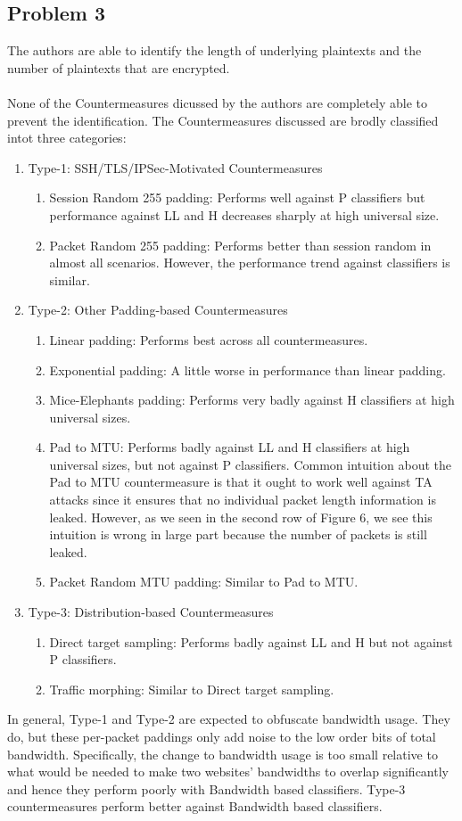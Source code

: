 \documentclass[10pt]{article}
\begin{document}
\begin{itemize}
\section{Problem 3}
The authors are able to identify the length of underlying plaintexts and the number of plaintexts that are encrypted.\\\\
None of the Countermeasures dicussed by the authors are completely able to prevent the identification. The Countermeasures discussed are brodly classified intot three categories:
\begin{enumerate}
\item Type-1: SSH/TLS/IPSec-Motivated Countermeasures
\begin{enumerate}
\item Session Random 255 padding: Performs well against P classifiers but performance against LL and H decreases sharply at high universal size.
\item Packet Random 255 padding: Performs better than session random in almost all scenarios. However, the performance trend against classifiers is similar.
\end{enumerate}
\item Type-2: Other Padding-based Countermeasures
\begin{enumerate}
\item Linear padding: Performs best across all countermeasures.
\item Exponential padding: A little worse in performance than linear padding.
\item Mice-Elephants padding: Performs very badly against H classifiers at high universal sizes.
\item Pad to MTU: Performs badly against LL and H classifiers at high universal sizes, but not against P classifiers. Common intuition about the Pad to MTU countermeasure is that it ought to work well against TA attacks since it ensures that no individual packet length information is
leaked. However, as we seen in the second row of Figure 6, we see this intuition is wrong in large part because the number of packets is still leaked.
\item Packet Random MTU padding: Similar to Pad to MTU.
\end{enumerate}
\item Type-3: Distribution-based Countermeasures
\begin{enumerate}
\item Direct target sampling: Performs badly against LL and H but not against P classifiers.
\item Traffic morphing: Similar to Direct target sampling.
\end{enumerate}
\end{enumerate}
In general, Type-1 and Type-2 are expected to obfuscate bandwidth usage. They do, but these per-packet paddings only add noise to the low order bits of total bandwidth. Specifically, the change to bandwidth usage is too small relative to what would be needed to make two websites’ bandwidths to overlap significantly and hence they perform poorly with Bandwidth based classifiers. Type-3 countermeasures perform better against Bandwidth based classifiers.

\end{itemize}
\end{document}
